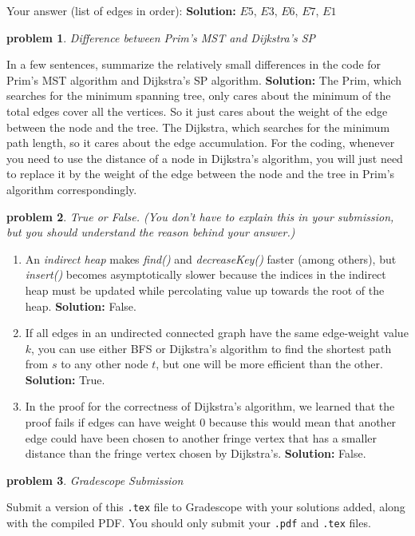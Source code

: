 \documentclass[10pt]{article}
\newcommand{\solution}[1]{\color{blue}\hfill\break\noindent\textbf{Solution:} #1\color{black}}
\newtheorem{problem}{\sc\color{cit}problem}
\begin{document}
Your answer (list of edges in order):
\solution{
    $E5$, $E3$, $E6$, $E7$, $E1$
}

\begin{problem} Difference between Prim's MST and Dijkstra's SP \end{problem}
In a few sentences, summarize the relatively small differences in the code for Prim's MST algorithm and Dijkstra's SP algorithm.
\solution{
    The Prim, which searches for the minimum spanning tree, only cares about the minimum of the total edges cover all the vertices. So it just cares about the weight of the edge between the node and the tree. The Dijkstra, which searches for the minimum path length, so it cares about the edge accumulation. For the coding, whenever you need to use the distance of a node in Dijkstra’s algorithm, you will just need to replace it by the weight of the edge between the node and the tree in Prim's algorithm correspondingly. 
}

\begin{problem} True or False. (You don't have to explain this in your submission, but you should understand the reason behind your answer.)  \end{problem}

\begin{enumerate}
\renewcommand{\theenumi}{\Alph{enumi}}

\item An \emph{indirect heap} makes \emph{find()} and \emph{decreaseKey()} faster (among others), but \emph{insert()\/} becomes asymptotically slower because the indices in the indirect heap must be updated while percolating value up towards the root of the heap.
\solution{
    False.
}

\item If all edges in an undirected connected graph have the same edge-weight value $k$, you can use either BFS or Dijkstra's algorithm to find the shortest path from $s$ to any other node $t$, but one will be more efficient than the other.
\solution{
    True.
}

\item In the proof for the correctness of Dijkstra's algorithm, we learned that the proof fails if edges can have weight $0$ because this would mean that another edge could have been chosen to another fringe vertex that has a smaller distance than the fringe vertex chosen by Dijkstra's.
\solution{
    False.
}

\end{enumerate}

  

\begin{problem} Gradescope Submission \end{problem}
Submit a version of this \verb|.tex| file to Gradescope with your solutions added, along with the compiled PDF.  You should only submit your \verb|.pdf| and \verb|.tex| files.
\end{document}
